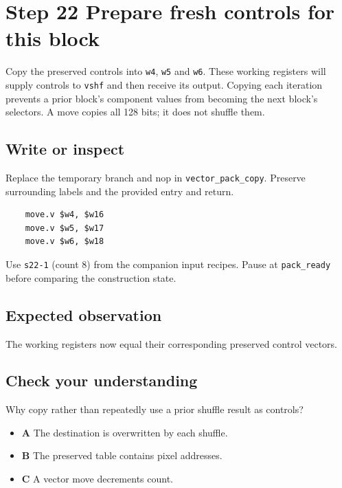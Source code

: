 \section{Step 22 Prepare fresh controls for this block}\label{rgb-s22}

Copy the preserved controls into \texttt{w4}, \texttt{w5} and \texttt{w6}. These working registers will supply controls to \texttt{vshf} and then receive its output. Copying each iteration prevents a prior block's component values from becoming the next block's selectors. A move copies all 128 bits; it does not shuffle them.

\subsection{Write or inspect}
Replace the temporary branch and nop in \texttt{vector\_pack\_copy}. Preserve surrounding labels and the provided entry and return.

\begin{verbatim}
    move.v $w4, $w16
    move.v $w5, $w17
    move.v $w6, $w18
\end{verbatim}
Use \texttt{s22-1} (count 8) from the companion input recipes. Pause at \texttt{pack\_ready} before comparing the construction state.

\subsection{Expected observation}
The working registers now equal their corresponding preserved control vectors.

\subsection{Check your understanding}
Why copy rather than repeatedly use a prior shuffle result as controls?

\begin{itemize}
  \item \textbf{A} The destination is overwritten by each shuffle.
  \item \textbf{B} The preserved table contains pixel addresses.
  \item \textbf{C} A vector move decrements count.
\end{itemize}
